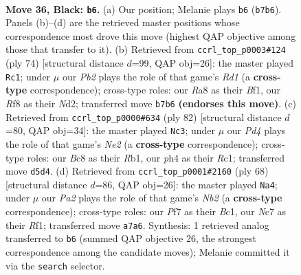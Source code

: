 \documentclass[11pt]{article}
\begin{document}
\clearpage

\begin{figure}[p]\centering
\begin{subfigure}{0.46\textwidth}\centering
\resizebox{\linewidth}{!}{%
\newchessgame
\chessboard[
  setfen={r1b2r2/ppn2p1k/5Bp1/q2p4/B5pP/NP6/R1PNQP2/5RK1 b - - 3 36},
  showmover=false,
  pgfstyle=straightmove, color=movearrow, markmove={b7-b6}
]}
\caption{}
\end{subfigure}\hfill
\begin{subfigure}{0.46\textwidth}\centering
\resizebox{\linewidth}{!}{%
\newchessgame
\chessboard[
  setfen={bn3rk1/5pp1/2nNp1qp/p3P3/2P2P2/6Q1/3N2PP/3R1B1K w - - 1 38},
  showmover=false,
  pgfstyle=straightmove, color=movearrow, markmove={d1-c1}
]}
\caption{}
\end{subfigure}
\\[4pt]
\begin{subfigure}{0.46\textwidth}\centering
\resizebox{\linewidth}{!}{%
\newchessgame
\chessboard[
  setfen={1q2r1k1/3r1pp1/p3p2p/QbP2n2/1P6/7P/4NPP1/1RR2BK1 w - - 3 42},
  showmover=false,
  pgfstyle=straightmove, color=movearrow, markmove={e2-c3}
]}
\caption{}
\end{subfigure}\hfill
\begin{subfigure}{0.46\textwidth}\centering
\resizebox{\linewidth}{!}{%
\newchessgame
\chessboard[
  setfen={6k1/p3r1p1/2bb3p/q1p5/2PpnP1Q/1P1B4/PN4PP/2B2RK1 w - - 12 35},
  showmover=false,
  pgfstyle=straightmove, color=movearrow, markmove={b2-a4}
]}
\caption{}
\end{subfigure}
\caption{\textbf{Move 36, Black: \texttt{b6}.} (a) Our position; Melanie plays \texttt{b6} (\texttt{b7b6}). Panels (b)--(d) are the retrieved master positions whose correspondence most drove this move (highest QAP objective among those that transfer to it). (b) Retrieved from \texttt{ccrl\_top\_p0003\#124} (ply 74) [structural distance $d$=99, QAP obj=26]: the master played \texttt{Rc1}; under $\mu$ our \emph{Pb2} plays the role of that game's \emph{Rd1} (a \textbf{cross-type} correspondence); cross-type roles: our \emph{R}a8 as their \emph{B}f1, our \emph{R}f8 as their \emph{N}d2; transferred move \texttt{b7b6} \textbf{(endorses this move)}. (c) Retrieved from \texttt{ccrl\_top\_p0000\#634} (ply 82) [structural distance $d$=80, QAP obj=34]: the master played \texttt{Nc3}; under $\mu$ our \emph{Pd4} plays the role of that game's \emph{Ne2} (a \textbf{cross-type} correspondence); cross-type roles: our \emph{B}c8 as their \emph{R}b1, our \emph{p}h4 as their \emph{R}c1; transferred move \texttt{d5d4}. (d) Retrieved from \texttt{ccrl\_top\_p0001\#2160} (ply 68) [structural distance $d$=86, QAP obj=26]: the master played \texttt{Na4}; under $\mu$ our \emph{Pa2} plays the role of that game's \emph{Nb2} (a \textbf{cross-type} correspondence); cross-type roles: our \emph{P}f7 as their \emph{B}c1, our \emph{N}c7 as their \emph{R}f1; transferred move \texttt{a7a6}. Synthesis: 1 retrieved analog transferred to \texttt{b6} (summed QAP objective 26, the strongest correspondence among the candidate moves); Melanie committed it via the \texttt{search} selector.}
\label{fig:thought-m71}
\end{figure}
\end{document}
